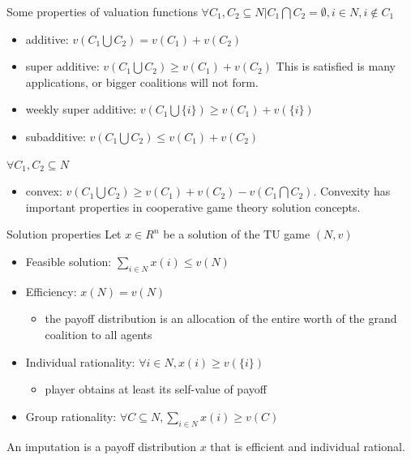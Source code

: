 \documentclass{beamer}
\begin{document}
\begin{frame}{Some properties of valuation functions}
    $\forall C_1,C_2 \subseteq N | C_1 \bigcap C_2 = \emptyset, i \in N, i \notin C_1$
    \begin{itemize}
        \item {\color{red} additive:} $v(C_1 \bigcup C_2) = v(C_1) + v(C_2)$
        \item {\color{red} super additive:} $v(C_1 \bigcup C_2) \geq v(C_1) + v(C_2)$ This is satisfied is many applications, or bigger coalitions will not form.
        \item {\color{red} weekly super additive:} $v(C_1 \bigcup \{i\}) \geq v(C_1) + v(\{i\})$
        \item {\color{red} subadditive:} $v(C_1 \bigcup C_2) \leq v(C_1) + v(C_2)$
    \end{itemize}

    $\forall C_1,C_2 \subseteq N$
    \begin{itemize}
        \item {\color{red} convex:} $v(C_1 \bigcup C_2) \geq v(C_1) + v(C_2) - v(C_1 \bigcap C_2)$. Convexity has important properties in cooperative game theory solution concepts.
    \end{itemize}
\end{frame}
\begin{frame}{Solution properties}
    Let $x \in R^n$ be a solution of the TU game $(N,v)$
    \begin{itemize}
        \item {\color{red} Feasible solution:} $\sum_{i \in N} x(i) \leq v(N)$
        \item {\color{red} Efficiency:} $x(N) = v(N)$
        \begin{itemize}
            \item the payoff distribution is an allocation of the entire worth of the grand coalition to all agents
        \end{itemize}
        \item {\color{red} Individual rationality:} $\forall i \in N, x(i) \geq v(\{i\})$
        \begin{itemize}
            \item player obtains at least its self-value of payoff
        \end{itemize}
        \item {\color{red} Group rationality:} $\forall C \subseteq N, \sum_{i \in N} x(i) \geq v(C)$
    \end{itemize}

    \vspace{0.2cm}

    An {\color{red} imputation} is a payoff distribution $x$ that is efficient and individual rational.

\end{frame}
\end{document}
